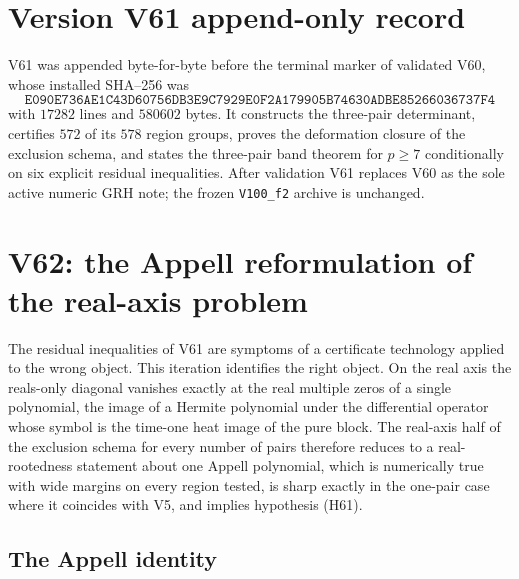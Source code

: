 \documentclass[11pt]{article}
\theoremstyle{definition}
\theoremstyle{remark}
\begin{document}
\section*{Version V61 append-only record}

V61 was appended byte-for-byte before the terminal marker of validated
V60, whose installed SHA--256 was
\[
 \texttt{E090E736AE1C43D60756DB3E9C7929E0}
 \allowbreak\texttt{F2A179905B74630ADBE85266036737F4}
\]
with \(17282\) lines and \(580602\) bytes.  It constructs the three-pair
determinant, certifies \(572\) of its \(578\) region groups, proves the
deformation closure of the exclusion schema, and states the three-pair
band theorem for \(p\ge7\) conditionally on six explicit residual
inequalities.  After validation V61 replaces V60 as the sole active
numeric GRH note; the frozen \texttt{V100\_f2} archive is unchanged.





\clearpage
\section{V62: the Appell reformulation of the real-axis problem}
\label{sec:f2v62-appell}
\begingroup
\setcounter{equation}{0}
\renewcommand{\theequation}{N62.\arabic{equation}}
\renewcommand{\theHequation}{f2v62.\arabic{equation}}

The residual inequalities of V61 are symptoms of a certificate
technology applied to the wrong object.  This iteration identifies the
right object.  On the real axis the reals-only diagonal vanishes exactly
at the real multiple zeros of a single polynomial, the image of a
Hermite polynomial under the differential operator whose symbol is the
time-one heat image of the pure block.  The real-axis half of the
exclusion schema for every number of pairs therefore reduces to a
real-rootedness statement about one Appell polynomial, which is
numerically true with wide margins on every region tested, is sharp
exactly in the one-pair case where it coincides with V5, and implies
hypothesis (H61).

\subsection{The Appell identity}
\end{document}
